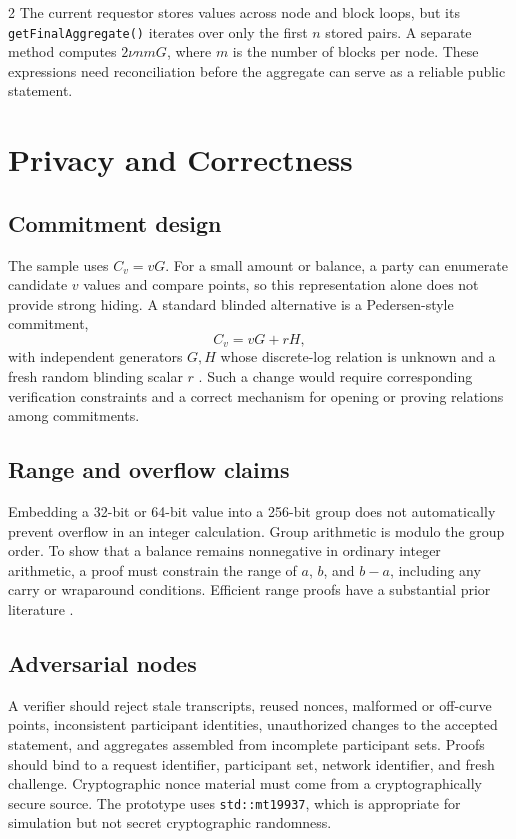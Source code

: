 \documentclass[10pt,letterpaper]{article}
\begin{document}
\begin{multicols}{2}
The current requestor stores values across node and block loops, but its \texttt{getFinalAggregate()} iterates over only the first $n$ stored pairs. A separate method computes $2\nu nmG$, where $m$ is the number of blocks per node. These expressions need reconciliation before the aggregate can serve as a reliable public statement.

\section{Privacy and Correctness}
\subsection{Commitment design}
The sample uses $C_v=vG$. For a small amount or balance, a party can enumerate candidate $v$ values and compare points, so this representation alone does not provide strong hiding. A standard blinded alternative is a Pedersen-style commitment,
\begin{equation}
 C_v=vG+rH,
\end{equation}
with independent generators $G,H$ whose discrete-log relation is unknown and a fresh random blinding scalar $r$ \cite{pedersen}. Such a change would require corresponding verification constraints and a correct mechanism for opening or proving relations among commitments.

\subsection{Range and overflow claims}
Embedding a 32-bit or 64-bit value into a 256-bit group does not automatically prevent overflow in an integer calculation. Group arithmetic is modulo the group order. To show that a balance remains nonnegative in ordinary integer arithmetic, a proof must constrain the range of $a$, $b$, and $b-a$, including any carry or wraparound conditions. Efficient range proofs have a substantial prior literature \cite{bulletproofs}.

\subsection{Adversarial nodes}
A verifier should reject stale transcripts, reused nonces, malformed or off-curve points, inconsistent participant identities, unauthorized changes to the accepted statement, and aggregates assembled from incomplete participant sets. Proofs should bind to a request identifier, participant set, network identifier, and fresh challenge. Cryptographic nonce material must come from a cryptographically secure source. The prototype uses \texttt{std::mt19937}, which is appropriate for simulation but not secret cryptographic randomness.


\end{multicols}
\end{document}
